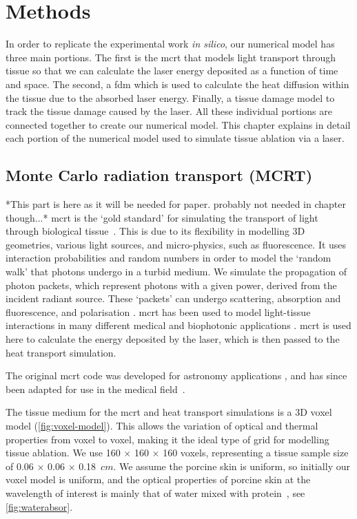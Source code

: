 \section{Methods}

In order to replicate the experimental work \textit{in silico}, our numerical model has three main portions. The first is the \gls{mcrt} that models light transport through tissue so that we can calculate the laser energy deposited as a function of time and space. The second, a \gls{fdm} which is used to calculate the heat diffusion within the tissue due to the absorbed laser energy. Finally, a tissue damage model to track the tissue damage caused by the laser. All these individual portions are connected together to create our numerical model. This chapter explains in detail each portion of the numerical model used to simulate tissue ablation via a laser.

\subsection{Monte Carlo radiation transport (MCRT)}

*This part is here as it will be needed for paper. probably not needed in chapter though...*
\gls{mcrt} is the `gold standard' for simulating the transport of light through biological tissue~\cite{kong2008efficient,wang1995mcml}. This is due to its flexibility in modelling 3D geometries, various light sources, and micro-physics, such as fluorescence. It uses interaction probabilities and random numbers in order to model the `random walk' that photons undergo in a turbid medium. We simulate the propagation of photon packets, which represent photons with a given power, derived from the incident radiant source. These `packets' can undergo scattering, absorption and fluorescence, and polarisation \cite{yao1999monte,welch1997propagation,wood1999model}. \gls{mcrt} has been used to model light-tissue interactions in many different medical and biophotonic applications \cite{campbell2015monte,boas2002three,patwardhan2005monte}. \gls{mcrt} is used here to calculate the energy deposited by the laser, which is then passed to the heat transport simulation.

The original \gls{mcrt} code was developed for astronomy applications \cite{wood1999model,wood2005estimating}, and has since been adapted for use in the medical field~\cite{campbell2015monte,barnard2018quantifying}.

The tissue medium for the \gls{mcrt} and heat transport simulations is a 3D voxel model (\cref{fig:voxel-model}). This allows the variation of optical and thermal properties from voxel to voxel, making it the ideal type of grid for modelling tissue ablation. We use  160 $\times$ 160 $\times$ 160 voxels, representing a tissue sample size of 0.06 $\times$ 0.06 $\times$ 0.18~$cm$. We assume the porcine skin is uniform, so initially our voxel model is uniform, and the optical properties of porcine skin at the wavelength of interest is mainly that of water mixed with protein~\cite{majaron2007effective}, see \cref{fig:waterabsor}.



